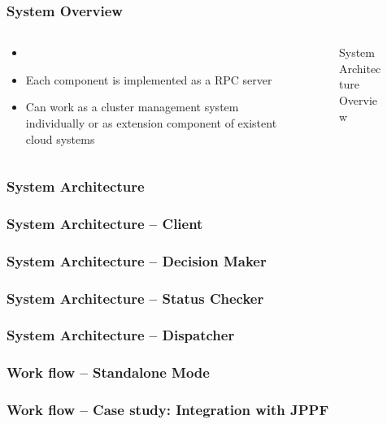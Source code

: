 \documentclass{beamer}
\begin{document}
\begin{frame}
  \frametitle{System Overview}
  \begin{columns}
    \begin{column}{.5\textwidth}
      \begin{itemize}
        \item 
        \item Each component is implemented as a RPC server
        \item Can work as a cluster management system individually or as
          extension component of existent cloud systems
      \end{itemize}
    \end{column}
    \begin{column}{.5\textwidth}
      \begin{figure}
        \centering
        \scalebox{0.4}{
          
        }
        \caption{System Architecture Overview}
        \label{fig:archi-overview}
      \end{figure}
    \end{column}
  \end{columns}
\end{frame}
\begin{frame}
  \frametitle{System Architecture}
\end{frame}
\begin{frame}
  \frametitle{System Architecture -- Client}
\end{frame}
\begin{frame}
  \frametitle{System Architecture -- Decision Maker}
\end{frame}
\begin{frame}
  \frametitle{System Architecture -- Status Checker}
\end{frame}
\begin{frame}
  \frametitle{System Architecture -- Dispatcher}
\end{frame}
\begin{frame}
  \frametitle{Work flow -- Standalone Mode}
\end{frame}
\begin{frame}
  \frametitle{Work flow -- Case study: Integration with JPPF}
\end{frame}
\end{document}
